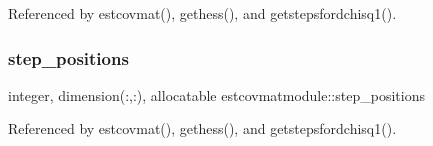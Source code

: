 Referenced by estcovmat(), gethess(), and getstepsfordchisq1().

\mbox{\label{namespaceestcovmatmodule_a5e47ee3f7267aa3efec263340a8244fc}} 
\subsubsection{\texorpdfstring{step\+\_\+positions}{step\_positions}}
{\footnotesize\ttfamily integer, dimension(\+:,\+:), allocatable estcovmatmodule\+::step\+\_\+positions}



Referenced by estcovmat(), gethess(), and getstepsfordchisq1().

